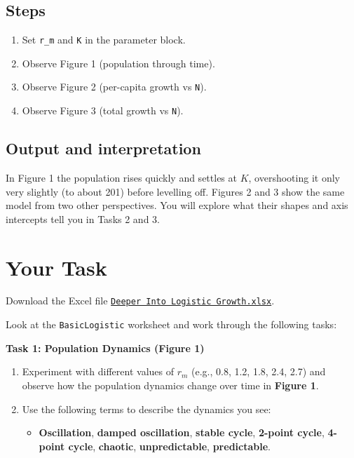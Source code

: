 \documentclass[
  a4paper]{book}
\providecommand{\tightlist}{%
  \setlength{\itemsep}{0pt}\setlength{\parskip}{0pt}}
\begin{document}
\subsection{Steps}\label{steps-5}

\begin{enumerate}
\def\labelenumi{\arabic{enumi}.}
\tightlist
\item
  Set \texttt{r\_m} and \texttt{K} in the parameter block.
\item
  Observe Figure 1 (population through time).
\item
  Observe Figure 2 (per-capita growth vs \texttt{N}).
\item
  Observe Figure 3 (total growth vs \texttt{N}).
\end{enumerate}

\subsection{Output and interpretation}\label{output-and-interpretation-5}

In Figure 1 the population rises quickly and settles at \(K\), overshooting it only very slightly (to about 201) before levelling off. Figures 2 and 3 show the same model from two other perspectives. You will explore what their shapes and axis intercepts tell you in Tasks 2 and 3.

\section{Your Task}\label{your-task-6}

Download the Excel file \href{https://www.dropbox.com/s/4xq399z7skl1akv/Deeper\%20into\%20Logistic\%20Growth.xlsx?dl=1}{\texttt{Deeper\ Into\ Logistic\ Growth.xlsx}}.

Look at the \texttt{BasicLogistic} worksheet and work through the following tasks:

\textbf{Task 1: Population Dynamics (Figure 1)}

\begin{enumerate}
\def\labelenumi{\arabic{enumi}.}
\item
  Experiment with different values of \(r_m\) (e.g., 0.8, 1.2, 1.8, 2.4, 2.7) and observe how the population dynamics change over time in \textbf{Figure 1}.
\item
  Use the following terms to describe the dynamics you see:

  \begin{itemize}
  \tightlist
  \item
    \textbf{Oscillation}, \textbf{damped oscillation}, \textbf{stable cycle}, \textbf{2-point cycle}, \textbf{4-point cycle}, \textbf{chaotic}, \textbf{unpredictable}, \textbf{predictable}.
  \end{itemize}
\end{enumerate}
\end{document}
